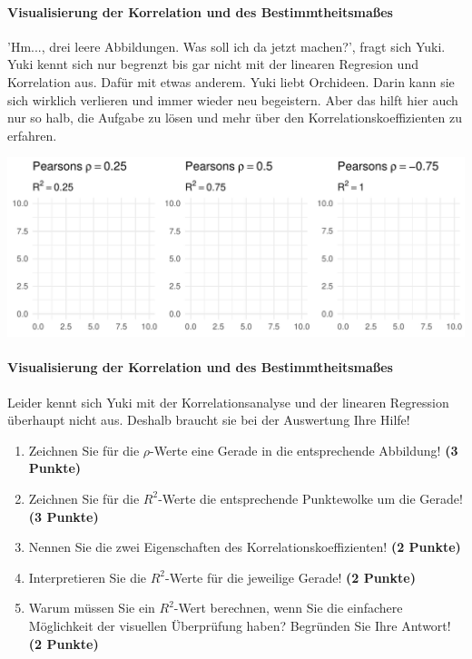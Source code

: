 \documentclass[a4paper, 9pt]{scrartcl}\usepackage[]{graphicx}\usepackage[]{xcolor}
\makeatletter
\def\maxwidth{ %
  \ifdim\Gin@nat@width>\linewidth
    \linewidth
  \else
    \Gin@nat@width
  \fi
}
\makeatother
\begin{document}
\paragraph{Visualisierung der Korrelation und des Bestimmtheitsmaßes}

'Hm..., drei leere Abbildungen. Was soll ich da jetzt machen?', fragt sich Yuki. Yuki kennt sich nur begrenzt bis gar nicht mit der linearen Regresion und Korrelation aus. Dafür mit etwas anderem. Yuki liebt Orchideen. Darin kann sie sich wirklich verlieren und immer wieder neu begeistern. Aber das hilft hier auch nur so halb, die Aufgabe zu lösen und mehr über den Korrelationskoeffizienten zu erfahren.
\vspace{2Ex}



{\centering \includegraphics[width=\maxwidth]{img/correlation-01-1} 

}




\paragraph{Visualisierung der Korrelation und des Bestimmtheitsmaßes}

\vspace{2Ex}

Leider kennt sich Yuki mit der Korrelationsanalyse und der linearen Regression überhaupt nicht aus. Deshalb braucht sie bei der Auswertung Ihre Hilfe!

\begin{enumerate}
\item Zeichnen Sie für die $\rho$-Werte eine Gerade in die entsprechende Abbildung! \textbf{(3 Punkte)}
\item Zeichnen Sie für die $R^2$-Werte die entsprechende Punktewolke um die Gerade! \textbf{(3 Punkte)}
\item Nennen Sie die zwei Eigenschaften des Korrelationskoeffizienten! \textbf{(2 Punkte)}
\item Interpretieren Sie die $R^2$-Werte für die jeweilige Gerade! \textbf{(2 Punkte)}
\item Warum müssen Sie ein $R^2$-Wert berechnen, wenn Sie die einfachere Möglichkeit der visuellen Überprüfung haben? Begründen Sie Ihre Antwort! \textbf{(2 Punkte)}
\end{enumerate}
 
\end{document}
